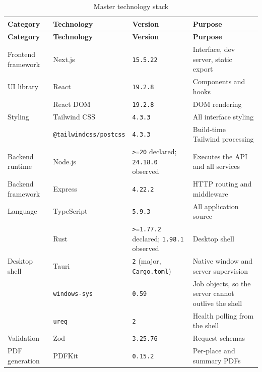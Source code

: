 \documentclass[11pt,a4paper]{report}
\newcommand{\code}[1]{\texttt{\small #1}}
\DeclareRobustCommand{\file}[1]{{\small\nolinkurl{#1}}}
\newcommand{\ver}[1]{\texttt{#1}}
\begin{document}
\begin{longtable}{@{}>{\raggedright\arraybackslash}p{3.0cm}>{\raggedright\arraybackslash}p{4.3cm}>{\raggedright\arraybackslash}p{2.6cm}>{\raggedright\arraybackslash}p{5.2cm}@{}}
\caption{Master technology stack}\label{tab:master}\\
\toprule
\textbf{Category} & \textbf{Technology} & \textbf{Version} & \textbf{Purpose}\\
\midrule
\endfirsthead
\toprule
\textbf{Category} & \textbf{Technology} & \textbf{Version} & \textbf{Purpose}\\
\midrule
\endhead
\bottomrule
\endfoot
Frontend framework   & Next.js                 & \ver{15.5.22} & Interface, dev server, static export\\
UI library           & React                   & \ver{19.2.8}  & Components and hooks\\
                     & React DOM               & \ver{19.2.8}  & DOM rendering\\
Styling              & Tailwind CSS            & \ver{4.3.3}   & All interface styling\\
                     & \code{@tailwindcss/postcss} & \ver{4.3.3} & Build-time Tailwind processing\\
Backend runtime      & Node.js                 & \code{>=20} declared; \ver{24.18.0} observed & Executes the API and all services\\
Backend framework    & Express                 & \ver{4.22.2}  & HTTP routing and middleware\\
Language             & TypeScript              & \ver{5.9.3}   & All application source\\
                     & Rust                    & \code{>=1.77.2} declared; \ver{1.98.1} observed & Desktop shell\\
Desktop shell        & Tauri                   & \ver{2} (major, \file{Cargo.toml}) & Native window and server supervision\\
                     & \code{windows-sys}      & \ver{0.59}    & Job objects, so the server cannot outlive the shell\\
                     & \code{ureq}             & \ver{2}       & Health polling from the shell\\
Validation           & Zod                     & \ver{3.25.76} & Request schemas\\
PDF generation       & PDFKit                  & \ver{0.15.2}  & Per-place and summary PDFs\\

\end{longtable}
\end{document}
